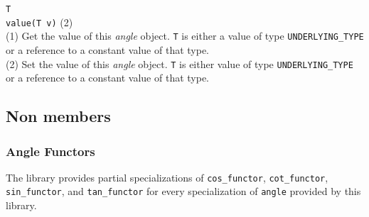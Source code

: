 \documentclass[oneside]{book}
\begin{document}
\noindent\texttt{T}\\
\texttt{value(T v)} (2)\\

\noindent{}(1) Get the value of this \textit{angle} object. \texttt{T} is either a value of type
\texttt{UNDERLYING\_TYPE} or a reference to a constant value of that type.\\

\noindent{}(2) Set the value of this \textit{angle} object. \texttt{T} is either value of type
\texttt{UNDERLYING\_TYPE} or a reference to a constant value of that type.\\

\subsection{Non members}
\subsubsection{Angle Functors}
The library provides partial specializations of \texttt{cos\_functor}, \texttt{cot\_functor},
\texttt{sin\_functor}, and \texttt{tan\_functor} for every specialization of \texttt{angle}
provided by this library.

\end{document}
